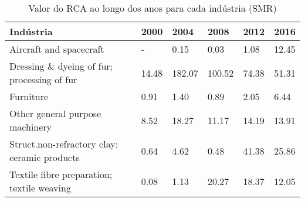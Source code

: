 \begin{table}
\centering
\caption{Valor do RCA ao longo dos anos para cada indústria (SMR)}
\begin{tabular}{p{6cm}p{1.5cm}p{1.5cm}p{1.5cm}p{1.5cm}p{1.5cm}}
\toprule
                                   Indústria &  2000 &   2004 &   2008 &  2012 &  2016 \\
\midrule
                     Aircraft and spacecraft &     - &   0.15 &   0.03 &  1.08 & 12.45 \\
 Dressing \& dyeing of fur; processing of fur & 14.48 & 182.07 & 100.52 & 74.38 & 51.31 \\
                                   Furniture &  0.91 &   1.40 &   0.89 &  2.05 &  6.44 \\
             Other general purpose machinery &  8.52 &  18.27 &  11.17 & 14.19 & 13.91 \\
Struct.non-refractory clay; ceramic products &  0.64 &   4.62 &   0.48 & 41.38 & 25.86 \\
  Textile fibre preparation; textile weaving &  0.08 &   1.13 &  20.27 & 18.37 & 12.05 \\
\bottomrule
\end{tabular}
\end{table}
